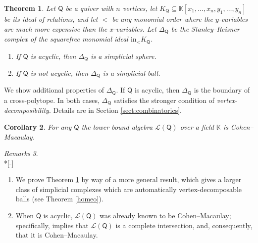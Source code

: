\documentclass[10pt]{amsart}
\numberwithin{equation}{section}
\newtheorem{thm}{Theorem}[section]
\newtheorem{cor}[thm]{Corollary}
\theoremstyle{definition}
\theoremstyle{remark}
\newtheorem{rems}[thm]{Remarks}
\renewcommand{\L}{\mathcal{L}}%
\newcommand{\1}{^{-1}}
\def\Q{\mathsf{Q}}
\begin{document}
\begin{thm}\label{thm:CM}
Let $\Q$ be a quiver with $n$ vertices, let $K_\Q\subseteq \mathbb{K}[x_1,\dots,x_n,y_1,\dots,y_n]$ be its ideal of relations, and let $<$ be any monomial order where the $y$-variables are much more expensive than the $x$-variables. Let $\Delta_\Q$ be the Stanley--Reisner complex of the squarefree monomial ideal $\textrm{in}_< K_\Q$.
\begin{enumerate}
\item If $\Q$ is acyclic, then $\Delta_\Q$ is a simplicial sphere.
\item If $\Q$ is not acyclic, then $\Delta_\Q$ is a simplicial ball.
\end{enumerate}
\end{thm}

\noindent We show additional properties of $\Delta_\Q$.  If $\Q$ is acyclic, then $\Delta_\Q$ is the boundary of a cross-polytope.  In both cases, $\Delta_\Q$ satisfies the stronger condition of \emph{vertex-decomposibility}. Details are in Section \ref{sect:combinatorics}.

\begin{cor}
For any $\Q$ the lower bound algebra $\L(\Q)$ over a field $\mathbb{K}$ is Cohen--Macaulay.
\end{cor}



\begin{rems}~\\*[-\baselineskip]
\begin{enumerate}
\item We prove Theorem \ref{thm:CM} by way of a more general result, which gives a larger class of simplicial complexes which are automatically vertex-decomposable balls (see Theorem \ref{homeo}).
\item When $\Q$ is acyclic, $\L(\Q)$ was already known to be Cohen--Macaulay; specifically, \cite[Corollary 1.17]{BFZ05} implies that $\L(\Q)$ is a complete intersection, and, consequently, that it is Cohen--Macaulay.
\end{enumerate}
\end{rems}
\end{document}
